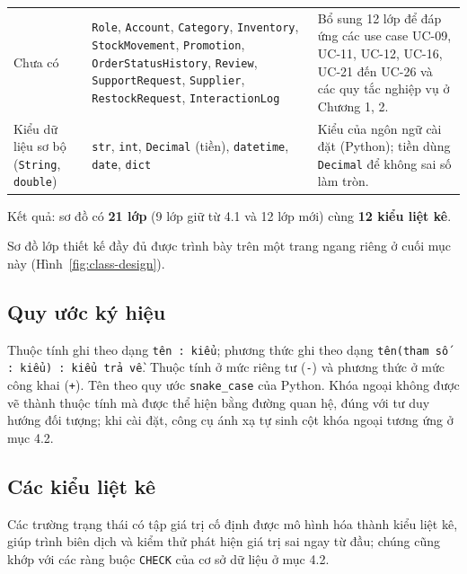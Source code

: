 \documentclass[12pt,a4paper,oneside]{report}
\begin{document}
\begin{longtable}{p{4.2cm}p{4.6cm}p{6.6cm}}
Chưa có & \texttt{Role}, \texttt{Account}, \texttt{Category}, \texttt{Inventory}, \texttt{StockMovement}, \texttt{Promotion}, \texttt{OrderStatusHistory}, \texttt{Review}, \texttt{SupportRequest}, \texttt{Supplier}, \texttt{RestockRequest}, \texttt{InteractionLog} & Bổ sung 12 lớp để đáp ứng các use case UC-09, UC-11, UC-12, UC-16, UC-21 đến UC-26 và các quy tắc nghiệp vụ ở Chương 1, 2. \\
Kiểu dữ liệu sơ bộ (\texttt{String}, \texttt{double}) & \texttt{str}, \texttt{int}, \texttt{Decimal} (tiền), \texttt{datetime}, \texttt{date}, \texttt{dict} & Kiểu của ngôn ngữ cài đặt (Python); tiền dùng \texttt{Decimal} để không sai số làm tròn. \\
\end{longtable}

Kết quả: sơ đồ có \textbf{21 lớp} (9 lớp giữ từ 4.1 và 12 lớp mới) cùng \textbf{12 kiểu liệt kê}.

Sơ đồ lớp thiết kế đầy đủ được trình bày trên một trang ngang riêng ở cuối mục này (Hình~\ref{fig:class-design}).

\subsection{Quy ước ký hiệu}

Thuộc tính ghi theo dạng \texttt{tên : kiểu}; phương thức ghi theo dạng \texttt{tên(tham số : kiểu) : kiểu trả về}. Thuộc tính ở mức riêng tư (\texttt{-}) và phương thức ở mức công khai (\texttt{+}). Tên theo quy ước \texttt{snake\_case} của Python. Khóa ngoại không được vẽ thành thuộc tính mà được thể hiện bằng đường quan hệ, đúng với tư duy hướng đối tượng; khi cài đặt, công cụ ánh xạ tự sinh cột khóa ngoại tương ứng ở mục 4.2.

\subsection{Các kiểu liệt kê}

Các trường trạng thái có tập giá trị cố định được mô hình hóa thành kiểu liệt kê, giúp trình biên dịch và kiểm thử phát hiện giá trị sai ngay từ đầu; chúng cũng khớp với các ràng buộc \texttt{CHECK} của cơ sở dữ liệu ở mục 4.2.
\end{document}
